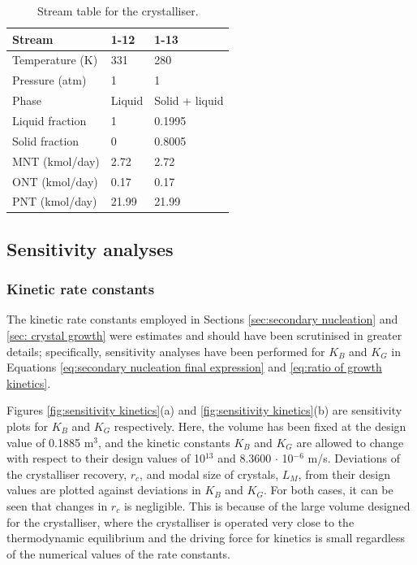 \begin{table}[h]
\centering
\caption{Stream table for the crystalliser.}
\label{tab:crystalliser stream table}
\begin{tabular}{@{}l|l|l@{}}
\toprule
Stream                  &    1-12  &  1-13 \\ \midrule
Temperature (K)   &    331      & 280 \\ \midrule
Pressure (atm)   &      1    &  1 \\ \midrule
Phase               &   Liquid    & Solid + liquid \\ \midrule
Liquid fraction       &   1       & 0.1995 \\ \midrule
Solid fraction         &  0        & 0.8005 \\ \midrule
MNT (kmol/day)          &  2.72        & 2.72 \\ \midrule
ONT (kmol/day)        &    0.17      & 0.17 \\ \midrule
PNT (kmol/day)          &    21.99      & 21.99 \\ \bottomrule
\end{tabular}
\end{table}

\subsection{Sensitivity analyses}

\subsubsection{Kinetic rate constants}\label{sec:kinetics sensitivity}

The kinetic rate constants employed in Sections \ref{sec:secondary nucleation} and \ref{sec: crystal growth} were estimates and should have been scrutinised in greater details; specifically, sensitivity analyses have been performed for $K_B$ and $K_G$ in Equations \ref{eq:secondary nucleation final expression} and \ref{eq:ratio of growth kinetics}.

Figures \ref{fig:sensitivity kinetics}(a) and \ref{fig:sensitivity kinetics}(b) are sensitivity plots for $K_B$ and $K_G$ respectively. Here, the volume has been fixed at the design value of 0.1885 m$^3$, and the kinetic constants $K_B$ and $K_G$ are allowed to change with respect to their design values of 10$^{13}$ and 8.3600 $\cdot$ 10$^{-6}$ m/s. Deviations of the crystalliser recovery, $r_c$, and modal size of crystals, $L_M$, from their design values are plotted against deviations in $K_B$ and $K_G$. For both cases, it can be seen that changes in $r_c$ is negligible. This is because of the large volume designed for the crystalliser, where the crystalliser is operated very close to the thermodynamic equilibrium and the driving force for kinetics is small regardless of the numerical values of the rate constants.

